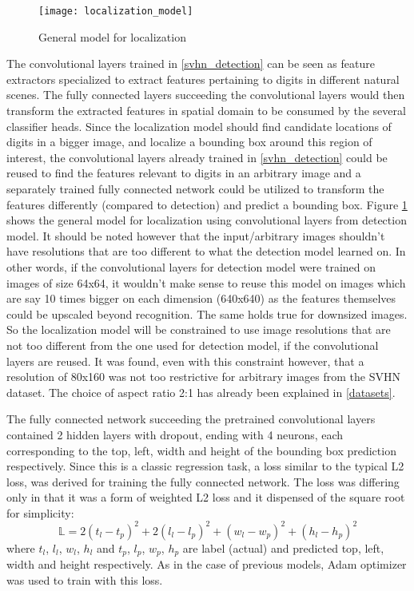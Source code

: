 \documentclass{article}
\begin{document}
	\begin{figure}[h]
		\centering
		\texttt{[image: localization\_model]}
		\caption{General model for localization}
		\label{fig:localization_model}
	\end{figure}
	
	The convolutional layers trained in \ref{svhn_detection} can be seen as feature extractors specialized to extract features pertaining to digits in different natural scenes. The fully connected layers succeeding the convolutional layers would then transform the extracted features in spatial domain to be consumed by the several classifier heads. Since the localization model should find candidate locations of digits in a bigger image, and localize a bounding box around this region of interest, the convolutional layers already trained in \ref{svhn_detection} could be reused to find the features relevant to digits in an arbitrary image and a separately trained fully connected network could be utilized to transform the features differently (compared to detection) and predict a bounding box. Figure \ref{fig:localization_model} shows the general model for localization using convolutional layers from detection model. It should be noted however that the input/arbitrary images shouldn't have resolutions that are too different to what the detection model learned on. In other words, if the convolutional layers for detection model were trained on images of size 64x64, it wouldn't make sense to reuse this model on images which are say 10 times bigger on each dimension (640x640) as the features themselves could be upscaled beyond recognition. The same holds true for downsized images. So the localization model will be constrained to use image resolutions that are not too different from the one used for detection model, if the convolutional layers are reused. It was found, even with this constraint however, that a resolution of 80x160 was not too restrictive for arbitrary images from the SVHN dataset. The choice of aspect ratio 2:1 has already been explained in \ref{datasets}.
	
	The fully connected network succeeding the pretrained convolutional layers contained 2 hidden layers with dropout, ending with 4 neurons, each corresponding to the top, left, width and height of the bounding box prediction respectively. Since this is a classic regression task, a loss similar to the typical L2 loss, was derived for training the fully connected network. The loss was differing only in that it was a form of weighted L2 loss and it dispensed of the square root for simplicity:
	\[\mathbb{L} = 2(t_l - t_p)^2 + 2(l_l - l_p)^2 + (w_l - w_p)^2 + (h_l - h_p)^2 \]
	where $t_l$, $l_l$, $w_l$, $h_l$ and $t_p$, $l_p$, $w_p$, $h_p$ are label (actual) and predicted top, left, width and height respectively. As in the case of previous models, Adam optimizer was used to train with this loss.
	
\end{document}
